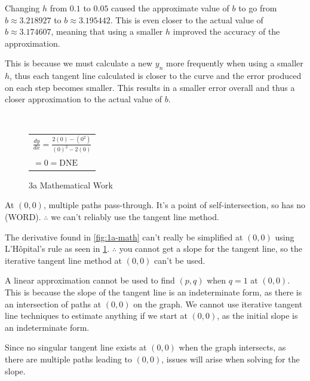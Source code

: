 \documentclass[answers,addpoints]{exam}
\begin{document}
\begin{questions}
\begin{solution}
    Changing $h$ from $0.1$ to $0.05$ caused the approximate value of $b$ to go from $b \approx 3.218927$ to $b \approx 3.195442$. This is even closer to the actual value of $b \approx 3.174607$, meaning that using a smaller $h$ improved the accuracy of the approximation.

    This is because we must calculate a new $y_n$ more frequently when using a smaller $h$, thus each tangent line calculated is closer to the curve and the error produced on each step becomes smaller. This results in a smaller error overall and thus a closer approximation to the actual value of $b$.

  \end{solution}

  \question \
  \begin{solution}

    \begin{figure}[H]
      \centering
      \begin{tabular}{@{}l@{}}
        $\displaystyle \frac{dy}{dx}=\frac{2(0)-(0^2)}{(0)^2-2(0)}$ \\[6pt]
        $\displaystyle =0=\text{DNE}$ \\[6pt]
      \end{tabular}
      \caption{3a Mathematical Work}
      \label{fig:3a-math}
    \end{figure}

    At $(0,0)$, multiple paths pass-through. It's a point of self-intersection, so has no (WORD). $\therefore$ we can't reliably use the tangent line method.

    The derivative found in \ref{fig:1a-math} can't really be simplified at $(0,0)$ using L'Hôpital's rule as seen in \ref{fig:3a-math}. $\therefore$ you cannot get a slope for the tangent line, so the iterative tangent line method at $(0,0)$ can't be used.

    A linear approximation cannot be used to find $(p,q)$ when $q=1$ at $(0,0)$. This is because the slope of the tangent line is an indeterminate form, as there is an intersection of paths at $(0,0)$ on the graph. We cannot use iterative tangent line techniques to estimate anything if we start at $(0,0)$, as the initial slope is an indeterminate form.

    Since no singular tangent line exists at $(0,0)$ when the graph intersects, as there are multiple paths leading to $(0,0)$, issues will arise when solving for the slope.


\end{solution}
\end{questions}
\end{document}

